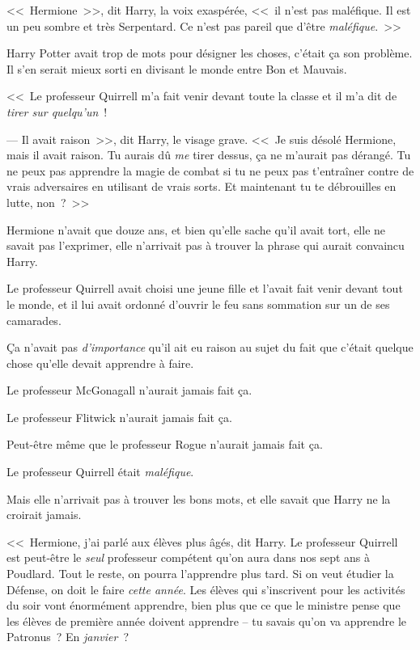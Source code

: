 <<~Hermione~>>, dit Harry, la voix exaspérée, <<~il n'est pas maléfique. Il est un peu sombre et très Serpentard. Ce n'est pas pareil que d'être \emph{maléfique}.~>>

Harry Potter avait trop de mots pour désigner les choses, c'était ça son problème. Il s'en serait mieux sorti en divisant le monde entre Bon et Mauvais.

<<~Le professeur Quirrell m'a fait venir devant toute la classe et il m'a dit de \emph{tirer sur quelqu'un}~!

--- Il avait raison~>>, dit Harry, le visage grave. <<~Je suis désolé Hermione, mais il avait raison. Tu aurais dû \emph{me} tirer dessus, ça ne m'aurait pas dérangé. Tu ne peux pas apprendre la magie de combat si tu ne peux pas t'entraîner contre de vrais adversaires en utilisant de vrais sorts. Et maintenant tu te débrouilles en lutte, non~?~>>

Hermione n'avait que douze ans, et bien qu'elle sache qu'il avait tort, elle ne savait pas l'exprimer, elle n'arrivait pas à trouver la phrase qui aurait convaincu Harry.

Le professeur Quirrell avait choisi une jeune fille et l'avait fait venir devant tout le monde, et il lui avait ordonné d'ouvrir le feu sans sommation sur un de ses camarades.

Ça n'avait pas \emph{d'importance} qu'il ait eu raison au sujet du fait que c'était quelque chose qu'elle devait apprendre à faire.

Le professeur McGonagall n'aurait jamais fait ça.

Le professeur Flitwick n'aurait jamais fait ça.

Peut-être même que le professeur Rogue n'aurait jamais fait ça.

Le professeur Quirrell était \emph{maléfique}.

Mais elle n'arrivait pas à trouver les bons mots, et elle savait que Harry ne la croirait jamais.

<<~Hermione, j'ai parlé aux élèves plus âgés, dit Harry. Le professeur Quirrell est peut-être le \emph{seul} professeur compétent qu'on aura dans nos sept ans à Poudlard. Tout le reste, on pourra l'apprendre plus tard. Si on veut étudier la Défense, on doit le faire \emph{cette année}. Les élèves qui s'inscrivent pour les activités du soir vont énormément apprendre, bien plus que ce que le ministre pense que les élèves de première année doivent apprendre -- tu savais qu'on va apprendre le Patronus~? En \emph{janvier}~?

